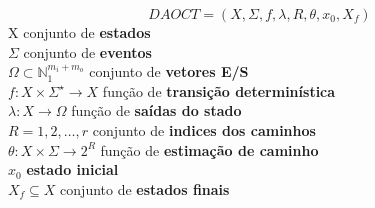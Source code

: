 \begin{frame}
\begin{definition}[DAOCT]
  \label{def:daoct}
  \small
  \[ DAOCT = (X,\Sigma,f,\lambda,R,\theta, x_0,X_f)\]
  \indent X conjunto de \textbf{estados} \\
  \indent $\Sigma$ conjunto de \textbf{eventos}\\
  \indent $\Omega \subset \mathbb{N}_1^{m_i+m_o} $ conjunto de \textbf{vetores E/S}\\
  \indent $f:  X \times \Sigma^\star \rightarrow X$ função de  \textbf{transição determinística}\\
  \indent $\lambda : X \rightarrow \Omega$ função de  \textbf{saídas do stado}\\
  \indent $R = {1,2,\dots,r}$ conjunto de \textbf{indices dos caminhos}\\
  \indent $\theta : X \times \Sigma \rightarrow 2^R$ função de \textbf{estimação
    de caminho}\\
  \indent $x_0$ \textbf{estado inicial} \\
  \indent $X_f \subseteq X $ conjunto de \textbf{estados finais}
\end{definition}
\end{frame}



